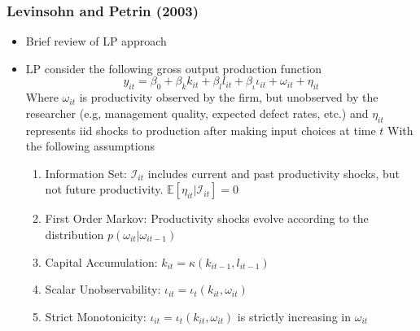 \documentclass{beamer}
\begin{document}

\begin{frame}
\frametitle{Levinsohn and Petrin (2003)}
\begin{itemize}
	\item Brief review of LP approach	
	\item LP consider the following gross output production function
	\begin{equation}
	y_{it}=\beta_{0}+\beta_{k}k_{it}+\beta_{l}l_{it}+\beta_{\iota}\iota_{it}+\omega_{it}+\eta_{it}
	\end{equation}
	Where $\omega_{it}$ is productivity observed by the firm, but unobserved by the researcher (e.g, management quality, expected defect rates, etc.) and $\eta_{it}$ represents iid shocks to production after making input choices at time $t$
	With the following assumptions
	\medskip
	\begin{enumerate}
		\item Information Set: $\mathcal{I}_{it}$ includes current and past productivity shocks, but not future productivity. $\mathbb{E}[\eta_{it}|\mathcal{I}_{it}]=0$
		\item First Order Markov: Productivity shocks evolve according to the distribution $p(\omega_{it}|\omega_{it-1})$
		\item Capital Accumulation: $k_{it}=\kappa(k_{it-1}, l_{it-1})$
		\item Scalar Unobservability: $\iota_{it}=\iota_{t}(k_{it}, \omega_{it})$
		\item Strict Monotonicity: $\iota_{it}=\iota_{t}(k_{it}, \omega_{it})$ is strictly increasing in $\omega_{it}$
	\end{enumerate}
\end{itemize}
\end{frame}

\end{document}
